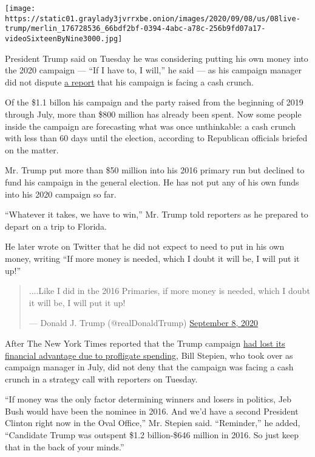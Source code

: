 \texttt{[image: https://static01.graylady3jvrrxbe.onion/images/2020/09/08/us/08live-trump/merlin\_176728536\_66bdf2bf-0394-4abc-a78c-256b9fd07a17-videoSixteenByNine3000.jpg]}

President Trump said on Tuesday he was considering putting his own money
into the 2020 campaign --- ``If I have to, I will,'' he said --- as his
campaign manager did not dispute
\href{https://www.nytimes3xbfgragh.onion/2020/09/07/us/politics/trump-election-campaign-fundraising.html}{a
report} that his campaign is facing a cash crunch.

Of the \$1.1 billon his campaign and the party raised from the beginning
of 2019 through July, more than \$800 million has already been spent.
Now some people inside the campaign are forecasting what was once
unthinkable: a cash crunch with less than 60 days until the election,
according to Republican officials briefed on the matter.

Mr. Trump put more than \$50 million into his 2016 primary run but
declined to fund his campaign in the general election. He has not put
any of his own funds into his 2020 campaign so far.

``Whatever it takes, we have to win,'' Mr. Trump told reporters as he
prepared to depart on a trip to Florida.

He later wrote on Twitter that he did not expect to need to put in his
own money, writing ``If more money is needed, which I doubt it will be,
I will put it up!''

\begin{quote}
....Like I did in the 2016 Primaries, if more money is needed, which I
doubt it will be, I will put it up!

--- Donald J. Trump (@realDonaldTrump)
\href{https://twitter.com/realDonaldTrump/status/1303368660736598016?ref_src=twsrc\%5Etfw}{September
8, 2020}
\end{quote}

After The New York Times reported that the Trump campaign
\href{https://www.nytimes3xbfgragh.onion/2020/09/07/us/politics/trump-election-campaign-fundraising.html?action=click\&module=RelatedLinks\&pgtype=Article}{had
lost its financial advantage due to profligate spending}, Bill Stepien,
who took over as campaign manager in July, did not deny that the
campaign was facing a cash crunch in a strategy call with reporters on
Tuesday.

``If money was the only factor determining winners and losers in
politics, Jeb Bush would have been the nominee in 2016. And we'd have a
second President Clinton right now in the Oval Office,'' Mr. Stepien
said. ``Reminder,'' he added, ``Candidate Trump was outspent \$1.2
billion-\$646 million in 2016. So just keep that in the back of your
minds.''

